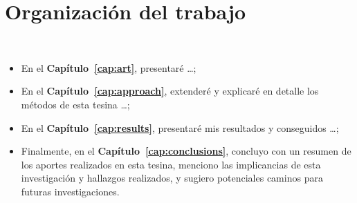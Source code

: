 \section{Organización del trabajo}
~\label{cap:intro:sec:outline}

\begin{itemize}
	\item En el \textbf{Capítulo~\ref{cap:art}}, presentaré \ldots ;

	\item En el \textbf{Capítulo~\ref{cap:approach}}, extenderé y explicaré en detalle
	      los métodos de esta tesina \ldots ;

	\item En el \textbf{Capítulo~\ref{cap:results}}, presentaré mis resultados y
	      conseguidos \ldots;

	\item Finalmente, en el \textbf{Capítulo~\ref{cap:conclusions}}, concluyo con un
	      resumen de los aportes realizados en esta tesina, menciono las implicancias de
	      esta investigación y hallazgos realizados, y sugiero potenciales caminos para
	      futuras investigaciones. %

\end{itemize}

